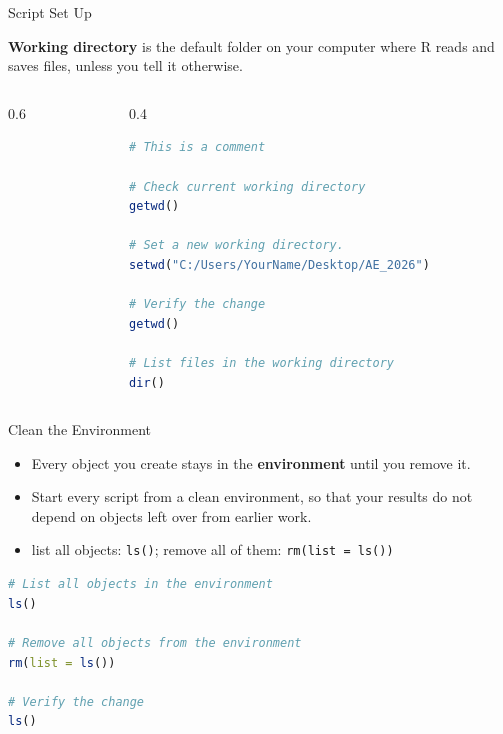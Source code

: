 \documentclass[9pt,aspectratio=169]{beamer}
\begin{document}
\begin{frame}[fragile]{Script Set Up}

\textbf{Working directory} is the default folder on your computer where R reads and saves files, unless you tell it otherwise.

\begin{columns}

\begin{column}{0.6\textwidth}
\end{column}

\begin{column}{0.4\textwidth}
\begin{lstlisting}[language=R, basicstyle=\ttfamily\tiny]
# This is a comment

# Check current working directory
getwd()

# Set a new working directory.
setwd("C:/Users/YourName/Desktop/AE_2026")

# Verify the change
getwd()

# List files in the working directory
dir()
\end{lstlisting}
\end{column}
\end{columns}
\end{frame}

\begin{frame}[fragile]{Clean the Environment}

\begin{itemize}
  \item Every object you create stays in the \textbf{environment} until you remove it.
  \item Start every script from a clean environment, so that your results do not depend on objects left over from earlier work.
  \item list all objects: \texttt{ls()}; remove all of them: \texttt{rm(list = ls())}
\end{itemize}

\begin{lstlisting}[language=R, basicstyle=\ttfamily\small]
# List all objects in the environment
ls()

# Remove all objects from the environment
rm(list = ls())

# Verify the change
ls()
\end{lstlisting}
\end{frame}
\end{document}
